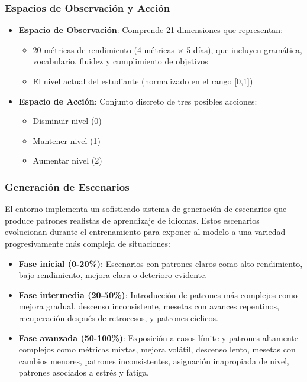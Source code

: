 \subsubsection{Espacios de Observación y Acción}

\begin{itemize}
    \item \textbf{Espacio de Observación}: Comprende 21 dimensiones que representan:
    \begin{itemize}
        \item 20 métricas de rendimiento (4 métricas × 5 días), que incluyen gramática, vocabulario, fluidez y cumplimiento de objetivos
        \item El nivel actual del estudiante (normalizado en el rango [0,1])
    \end{itemize}
    
    \item \textbf{Espacio de Acción}: Conjunto discreto de tres posibles acciones:
    \begin{itemize}
        \item Disminuir nivel (0)
        \item Mantener nivel (1)
        \item Aumentar nivel (2)
    \end{itemize}
\end{itemize}


\subsubsection{Generación de Escenarios}
\label{generacion-escenarios}

El entorno implementa un sofisticado sistema de generación de escenarios que produce patrones realistas de aprendizaje de idiomas. Estos escenarios evolucionan durante el entrenamiento para exponer al modelo a una variedad progresivamente más compleja de situaciones:

\begin{itemize}
    \item \textbf{Fase inicial (0-20\%)}: Escenarios con patrones claros como alto rendimiento, bajo rendimiento, mejora clara o deterioro evidente.
    
    \item \textbf{Fase intermedia (20-50\%)}: Introducción de patrones más complejos como mejora gradual, descenso inconsistente, mesetas con avances repentinos, recuperación después de retrocesos, y patrones cíclicos.
    
    \item \textbf{Fase avanzada (50-100\%)}: Exposición a casos límite y patrones altamente complejos como métricas mixtas, mejora volátil, descenso lento, mesetas con cambios menores, patrones inconsistentes, asignación inapropiada de nivel, patrones asociados a estrés y fatiga.
\end{itemize}

